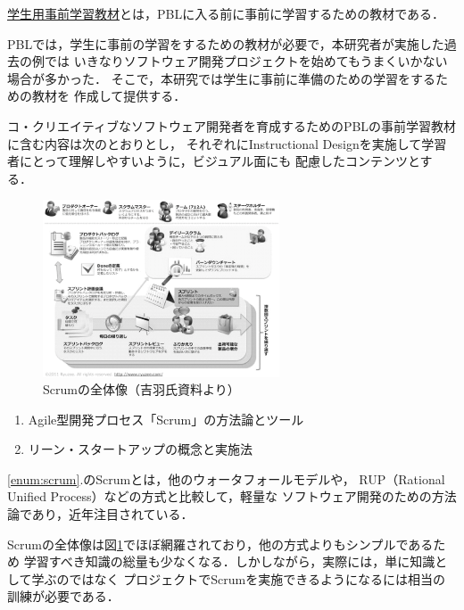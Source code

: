 \documentclass[11pt,a4paper,twoside]{jarticle}
\newcommand{\研究種別}{A}	%
\newcommand{\研究課題名}{コ・クリエイティブなソフトウェア開発者を育成するPBL型教育}
\newcommand{\研究機関名}{産業技術大学院大学}
\newcommand{\研究代表者氏名}{中鉢　欣秀}
\newcommand{\研究代表者氏名ふりがな}{ちゅうばち　よしひで}
\newcommand{\本応募effort}{\KLEffort{18}}	%
\newcommand{\研究期間の最終元号年度}{27}	%
\begin{document}
{	%

	\underline{学生用事前学習教材}とは，PBLに入る前に事前に学習するための教材である．
	
	PBLでは，学生に事前の学習をするための教材が必要で，本研究者が実施した過去の例では
	いきなりソフトウェア開発プロジェクトを始めてもうまくいかない場合が多かった．
	そこで，本研究では学生に事前に準備のための学習をするための教材を	作成して提供する．
	
	コ・クリエイティブなソフトウェア開発者を育成するためのPBLの事前学習教材に含む内容は次のとおりとし，
	それぞれにInstructional Designを実施して学習者にとって理解しやすいように，ビジュアル面にも
	配慮したコンテンツとする．
	
         \begin{figure}
     		\vspace{-2.5cm}
         	\begin{center}
		         \includegraphics[width=7cm]{figs/scrum.eps}
		         \caption{Scrumの全体像（吉羽氏資料より）}
		         \label{fig:scrum}
	         \end{center}
         \end{figure}

	\begin{enumerate}
	  \item \label{enum:scrum} Agile型開発プロセス「Scrum」の方法論とツール
	  \item \label{enum:lean} リーン・スタートアップの概念と実施法
	\end{enumerate}
	

	\ref{enum:scrum}.のScrumとは，他のウォータフォールモデルや，
	RUP（Rational Unified Process）などの方式と比較して，軽量な
	ソフトウェア開発のための方法論であり，近年注目されている．
	
	Scrumの全体像は図\ref{fig:scrum}でほぼ網羅されており，他の方式よりもシンプルであるため
	学習すべき知識の総量も少なくなる．しかしながら，実際には，単に知識として学ぶのではなく
	プロジェクトでScrumを実施できるようになるには相当の訓練が必要である．
	
}
\end{document}
